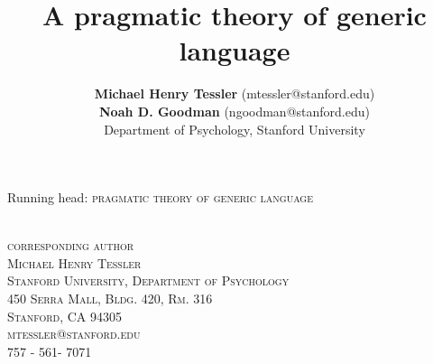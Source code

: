 \documentclass[12pt,letterpaper]{article}
\title{A pragmatic theory of generic language}
\author{{\large \bf Michael Henry Tessler} (mtessler@stanford.edu)\\ {\large \bf Noah D. Goodman} (ngoodman@stanford.edu) \\
  Department of Psychology, Stanford University}
\date{}
\begin{document}
\maketitle


Running head: \textsc{pragmatic theory of generic language}

\vspace{80 mm}
{
\textsc{\\corresponding author \\
Michael Henry Tessler \\
Stanford University, Department of Psychology \\
450 Serra Mall, Bldg. 420, Rm. 316 \\
Stanford, CA 94305 \\
mtessler@stanford.edu \\
757 - 561- 7071}

}
\newpage


%
\end{document}

